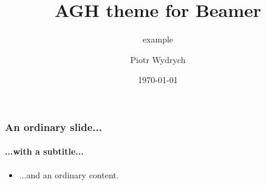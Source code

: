 \documentclass{beamer}
\title{AGH theme for Beamer}
\subtitle{example}
\author{Piotr Wydrych}
\institute{Department of Telecommunications}
\date{\today}
\begin{document}
\titleframe[en]

\begin{frame}\frametitle{An ordinary slide...}\framesubtitle{...with a subtitle...}
    \begin{itemize}[<+-|alert@+>]
        \item ...and an ordinary content.
    \end{itemize}
\end{frame}
\end{document}
